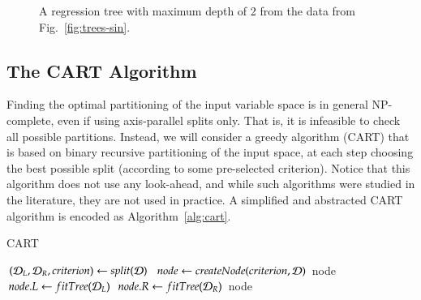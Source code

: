 \begin{refsection}
\begin{figure}[htbp]
\label{fig:fig:trees-sin-2}
\caption{A regression tree with maximum depth of 2 from the data from Fig.~\ref{fig:trees-sin}.}
\end{figure}

\subsection*{The CART Algorithm}

Finding the optimal partitioning of the input variable space is in general NP-complete, even if using axis-parallel splits only. That is, it is infeasible to check all possible partitions. Instead, we will consider a greedy algorithm (CART) that is based on binary recursive partitioning of the input space, at each step choosing the best possible split (according to some pre-selected criterion). Notice that this algorithm does not use any look-ahead, and while such algorithms were studied in the literature, they are not used in practice. A simplified and abstracted CART algorithm is encoded as Algorithm~\ref{alg:cart}.

\begin{algorithm}
\caption{CART}\label{alg:cart}
\begin{algorithmic}[1]
\State $(\mathcal{D}_L, \mathcal{D}_R, criterion) \gets split(\mathcal{D})$
\State $node \gets createNode(criterion, \mathcal{D})$
 \Return node \EndIf
\State $node.L \gets fitTree(\mathcal{D}_L)$
\State $node.R \gets fitTree(\mathcal{D}_R)$
\State \Return node
\EndProcedure
\end{algorithmic}
\end{algorithm}


\end{refsection}
